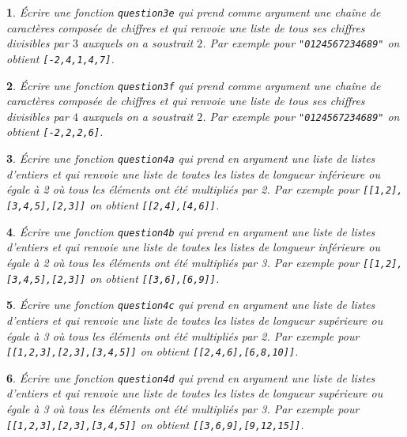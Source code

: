 \documentclass[10pt]{article}
\newtheorem{exi}{}
\newenvironment{exo}{\begin{exi}\em}{\end{exi}}
\begin{document}
\begin{exo}
    Écrire une fonction {\tt question3e} qui prend comme argument une chaîne de
caractères composée de chiffres
et qui renvoie une liste de tous ses chiffres divisibles par $3$
auxquels on a soustrait $2$. Par
exemple pour \verb+"0124567234689"+ on obtient \verb+[-2,4,1,4,7]+.
\end{exo}
\vspace*{-2ex}
\begin{exo}
    Écrire une fonction {\tt question3f} qui prend comme argument une chaîne de
caractères composée de chiffres
et qui renvoie une liste de tous ses chiffres divisibles par $4$
auxquels on a soustrait $2$. Par
exemple pour \verb+"0124567234689"+ on obtient \verb+[-2,2,2,6]+.
\end{exo}
\vspace*{-2ex}
\begin{exo}
    Écrire une fonction {\tt question4a} qui prend en argument une liste de listes d'entiers et qui renvoie une liste de toutes les listes
de longueur inférieure ou égale à 2 où tous les éléments ont été multipliés par 2. Par exemple pour \verb+[[1,2],[3,4,5],[2,3]]+ on obtient \verb+[[2,4],[4,6]]+.
\end{exo}
\vspace*{-2ex}
\begin{exo}
    Écrire une fonction {\tt question4b} qui prend en argument une liste de listes d'entiers et qui renvoie une liste de toutes les listes
de longueur inférieure ou égale à 2 où tous les éléments ont été multipliés par 3. Par exemple pour \verb+[[1,2],[3,4,5],[2,3]]+ on obtient \verb+[[3,6],[6,9]]+.
\end{exo}
\vspace*{-2ex}
\begin{exo}
    Écrire une fonction {\tt question4c} qui prend en argument une liste de listes d'entiers et qui renvoie une liste de toutes les listes
de longueur supérieure ou égale à 3 où tous les éléments ont été multipliés par 2. Par exemple pour \verb+[[1,2,3],[2,3],[3,4,5]]+ on obtient \verb+[[2,4,6],[6,8,10]]+.
\end{exo}
\vspace*{-2ex}
\begin{exo}
    Écrire une fonction {\tt question4d} qui prend en argument une liste de listes d'entiers et qui renvoie une liste de toutes les listes
de longueur supérieure ou égale à 3 où tous les éléments ont été multipliés par 3. Par exemple pour \verb+[[1,2,3],[2,3],[3,4,5]]+ on obtient \verb+[[3,6,9],[9,12,15]]+.
\end{exo}
\end{document}
